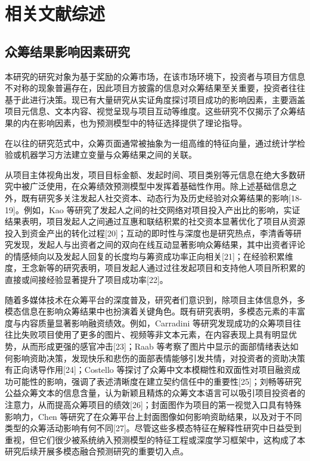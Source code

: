\newpage
\setcounter{table}{0}
\setcounter{figure}{0}
\section{相关文献综述}

\subsection{众筹结果影响因素研究}

本研究的研究对象为基于奖励的众筹市场，在该市场环境下，投资者与项目方信息不对称的现象普遍存在，因此项目方披露的信息对众筹结果至关重要，投资者往往基于此进行决策。现已有大量研究从实证角度探讨项目成功的影响因素，主要涵盖项目元信息、文本内容、视觉呈现与项目互动等维度。这些研究不仅揭示了众筹结果的内在影响因素，也为预测模型中的特征选择提供了理论指导。

在以往的研究范式中，众筹页面通常被抽象为一组高维的特征向量，通过统计学检验或机器学习方法建立变量与众筹结果之间的关联。

从项目主体视角出发，项目目标金额、发起时间、项目类别等元信息在绝大多数研究中被广泛使用，在众筹绩效预测模型中发挥着基础性作用。除上述基础信息之外，既有研究多关注发起人社交资本、动态行为及历史经验对众筹结果的影响[18-19]。例如，Kao 等研究了发起人之间的社交网络对项目投入产出比的影响，实证结果表明，项目发起人之间通过互惠和联结积累的社交资本显著优化了项目从资源投入到资金产出的转化过程[20]；互动的即时性与深度也是研究热点，李清香等研究发现，发起人与出资者之间的双向在线互动显著影响众筹结果，其中出资者评论的情感倾向以及发起人回复的长度均与筹资成功率正向相关[21]；在经验积累维度，王念新等的研究表明，项目发起人通过过往发起项目和支持他人项目所积累的直接或间接经验显著提升了项目成功率[22]。

随着多媒体技术在众筹平台的深度普及，研究者们意识到，除项目主体信息外，多模态信息在影响众筹结果中也扮演着关键角色。既有研究表明，多模态元素的丰富度与内容质量显著影响融资绩效。例如，Carradini 等研究发现成功的众筹项目往往比失败项目使用了更多的图片、视频等非文本元素，在内容表现上具有明显优势，从而形成更强的感官冲击[23]；Raab 等考察了图片中显示的面部情绪表达如何影响资助决策，发现快乐和悲伤的面部表情能够引发共情，对投资者的资助决策有正向诱导作用[24]；Costello 等探讨了众筹中文本模糊性和双面性对项目融资成功可能性的影响，强调了表述清晰度在建立契约信任中的重要性[25]；刘畅等研究公益众筹文本的信息含量，认为新颖且精炼的众筹文本语言可以吸引项目投资者的注意力，从而提高众筹项目的绩效[26]；封面图作为项目的第一视觉入口具有特殊影响力，Chen 等研究了在众筹平台上封面图像如何影响资助结果，以及对于不同类型的众筹活动影响有何不同[27]。尽管这些多模态特征在解释性研究中日益受到重视，但它们很少被系统纳入预测模型的特征工程或深度学习框架中，这构成了本研究后续开展多模态融合预测研究的重要切入点。


